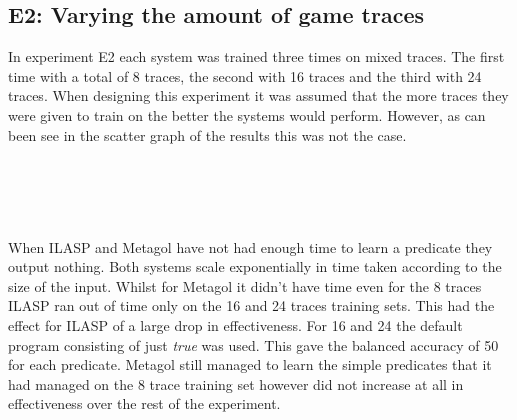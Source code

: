 \subsection{E2: Varying the amount of game traces}
In experiment E2 each system was trained three times on mixed traces. The first time with a total of 8 traces, the second with 16 traces and the third with 24 traces. When designing this experiment it was assumed that the more traces they were given to train on the better the systems would perform. However, as can been see in the scatter graph of the results this was not the case.
\\\\\\
\\\\
When ILASP and Metagol have not had enough time to learn a predicate they output nothing. Both systems scale exponentially in time taken according to the size of the input. Whilst for Metagol it didn't have time even for the 8 traces ILASP ran out of time only on the 16 and 24 traces training sets. This had the effect for ILASP of a large drop in effectiveness. For 16 and 24 the default program consisting of just \textit{true} was used. This gave the balanced accuracy of 50 for each predicate. Metagol still managed to learn the simple predicates that it had managed on the 8 trace training set however did not increase at all in effectiveness over the rest of the experiment.

